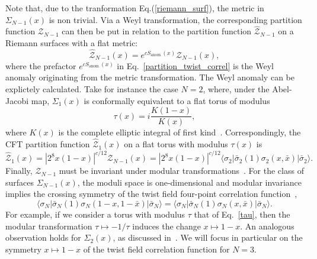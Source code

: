 \documentclass[a4paper,11pt]{article}
\begin{document}
\noindent Note that, due to the tranformation Eq.(\ref{riemann_surf}), the metric in $\Sigma_{N-1}(x)$ is non trivial.  Via a Weyl transformation, the corresponding partition function $\mathcal{Z}_{N-1}$ can then be put in relation to the partition function $\mathcal{\hat{Z}}_{N-1}$ on a Riemann surfaces with a flat metric\cite{Lunin}:  
\begin{equation}\label{partition_twist_correl}
 \mathcal{\hat{Z}}_{N-1}(x)=e^{cS_{\text{anom.}}(x)} \mathcal{Z}_{N-1}(x),
\end{equation}
where the prefactor $e^{cS_{\text{anom.}}(x)}$ in Eq.~\eqref{partition_twist_correl} is the Weyl anomaly originating from the metric transformation.
\noindent The Weyl anomaly can be explictely calculated. Take for instance the case $N=2$, where, under the Abel-Jacobi map, $\Sigma_{1}(x)$ is conformally equivalent to a flat torus of modulus 
\begin{equation}\label{tau}
 \tau(x)=i\frac{K(1-x)}{K(x)}, 
\end{equation}
where $K(x)$ is the complete elliptic integral of first 
kind~\cite{Whittaker}. Correspondingly, the CFT partition function $\mathcal{\hat{Z}}_1(x)$ on a flat torus 
with modulus $\tau(x)$ is~\cite{Lunin}
\begin{equation}\label{partition_torus_twist}
 \mathcal{\hat{Z}}_1(x)=|2^8 x(1-x)|^{c/12} \mathcal{Z}_{N-1}(x)=|2^8 x(1-x)|^{c/12} \langle \sigma_2|\bar{\sigma}_2(1)\sigma_2(x, \bar{x})|\bar{\sigma}_2\rangle.
\end{equation}
Finally, $\mathcal{Z}_{N-1}$ must be invariant  
under modular transformations~\cite{CardyMod, Cappelli, Cappelli2}.  For the class of surfaces $\Sigma_{N-1}(x)$, the moduli space is one-dimensional and modular invariance implies the crossing
symmetry of the twist field four-point correlation function~\cite{Cardy},
\begin{equation}\label{cross_symmetry}
 \langle \sigma_N|\bar{\sigma}_N(1)\sigma_N(1-x, 1-\bar{x})|\bar{\sigma}_N\rangle=
 \langle \sigma_N|\bar{\sigma}_N(1)\sigma_N(x, \bar{x})|\bar{\sigma}_N\rangle. 
\end{equation}
For example, if we consider a torus with modulus $\tau$ that of Eq.~\eqref{tau},
then the modular transformation $\tau\mapsto-1/\tau$ induces the change
$x\mapsto 1-x$. An analogous observation holds for $\Sigma_{2}(x)$, as discussed in~\cite{Cardy}.
 We will focus in particular on 
the symmetry $x\mapsto 1-x$ of the twist field correlation function for $N=3$. 
\end{document}
